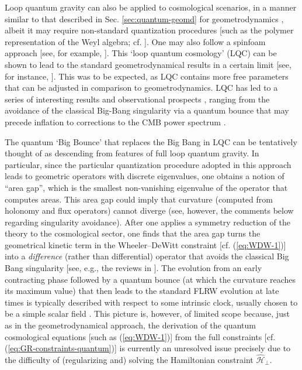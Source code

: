 \documentclass[12pt]{iopart}
\def\eref#1{(\ref{eq:#1})}
\begin{document}
Loop quantum gravity can also be applied to cosmological scenarios, in a manner similar to that described in Sec. \ref{sec:quantum-geomd} for geometrodynamics \citep{Ashtekar:2003hd,Bojowald:2001xa,Ashtekar:2011ni,Bojowald:2011zzb}, albeit it may require non-standard quantization procedures [such as the polymer representation of the Weyl algebra; cf. \citet{Kiefer:book}]. One may also follow a spinfoam approach [see, for example, \citet{Bianchi:2010zs,Henderson:2010qd}]. This `loop quantum cosmology' (LQC) can be shown to lead to the standard geometrodynamical results in a certain limit [see, for instance, \citet{Bojowald:2001ep,Ashtekar:2007em}]. This was to be expected, as LQC contains more free parameters that can be adjusted in comparison to geometrodynamics. LQC has led to a series of interesting results and observational prospects \citep{Sakellariadou:2010ue,Agullo:2020iqv,Agullo:2020wur}, ranging from the avoidance of the classical Big-Bang singularity via a quantum bounce that may precede inflation \citep{Ashtekar:2011ni,Agullo:2020wur} to corrections to the CMB power spectrum \citep{Bojowald:2011iq,Barrau:2013ula,Barrau:2018gyz,Agullo:2013ai,Ashtekar:2015dja,Agullo:2015aba,Ashtekar:2016wpi,CastelloGomar:2017kbo,Ashtekar:2021izi}.

The quantum `Big Bounce' that replaces the Big Bang in LQC can be tentatively thought of as descending from features of full loop quantum gravity. In particular, since the particular quantization procedure adopted in this approach leads to geometric operators with discrete eigenvalues, one obtains a notion of ``area gap'', which is the smallest non-vanishing eigenvalue of the operator that computes areas. This area gap could imply that curvature (computed from holonomy and flux operators) cannot diverge (see, however, the comments below regarding singularity avoidance). After one applies a symmetry reduction of the theory to the cosmological sector, one finds that the area gap turns the geometrical kinetic term in the Wheeler--DeWitt constraint [cf. \eref{WDW-1}] into a \emph{difference} (rather than differential) operator that avoids the classical Big Bang singularity [see, e.g., the reviews in \citet{Kiefer:book,Ashtekar:2021izi}]. The evolution from an early contracting phase followed by a quantum bounce (at which the curvature reaches its maximum value) that then leads to the standard FLRW evolution at late times is typically described with respect to some intrinsic clock, usually chosen to be a simple scalar field \citep{Ashtekar:2021izi}. This picture is, however, of limited scope because, just as in the geometrodynamical approach, the derivation of the quantum cosmological equations [such as \eref{WDW-1}] from the full constraints [cf. \eref{GR-constraints-quantum}] is currently an unresolved issue precisely due to the difficulty of (regularizing and) solving the Hamiltonian constraint $\hat{\mathcal{H}}_{\perp}$.
\end{document}
